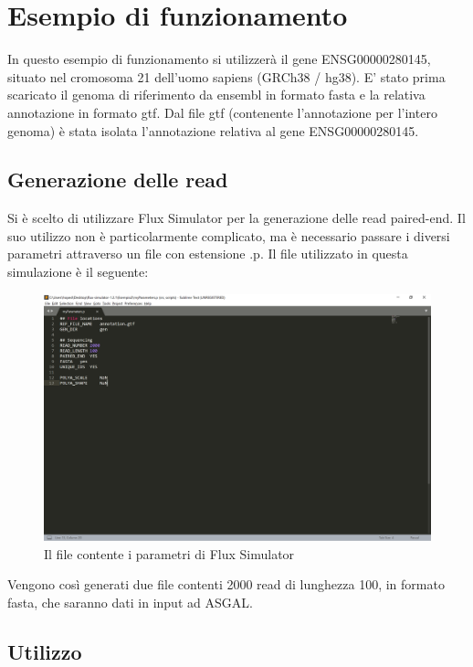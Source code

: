 \section{Esempio di funzionamento}

In questo esempio di funzionamento si utilizzerà il gene ENSG00000280145, situato nel cromosoma 21 dell'uomo sapiens (GRCh38 / hg38). E' stato prima scaricato il   genoma di riferimento da ensembl in formato fasta e la relativa annotazione in formato gtf. Dal file gtf (contenente l'annotazione per l'intero genoma) è stata isolata l'annotazione relativa al gene ENSG00000280145.

\subsection{Generazione delle read}

Si è scelto di utilizzare Flux Simulator per la generazione delle read paired-end. Il suo utilizzo non è particolarmente complicato, ma è necessario passare i diversi parametri attraverso un file con estensione .p. Il file utilizzato in questa simulazione è il seguente:

\begin{figure}[h]
	\centering
	\includegraphics[width=\linewidth]{images/parameters.png}
  \caption{Il file contente i parametri di Flux Simulator}
  \label{fig:Parameters}
\end{figure}

Vengono così generati due file contenti 2000 read di lunghezza 100, in formato fasta, che saranno dati in input ad ASGAL.

\newpage

\subsection{Utilizzo}

